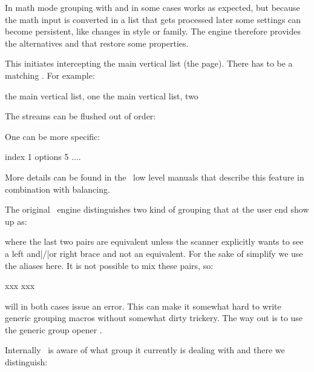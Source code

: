 \startnewprimitive[title={\prm {beginmathgroup}}]

In math mode grouping with  and  in some cases
works as expected, but because the math input is converted in a list that gets
processed later some settings can become persistent, like changes in style or
family. The engine therefore provides the alternatives  and
 that restore some properties.

\stopnewprimitive

\startnewprimitive[title={\prm {beginmvl}}]

This initiates intercepting the main vertical list (the page). There has to be a
matching . For example:

\starttyping
{} the main vertical list, one \endmvl
{} the main vertical list, two \endmvl
\stoptyping

The streams can be flushed out of order:

\starttyping
\setbox\scratchboxone{}
\setbox\scratchboxtwo{}
\stoptyping

One can be more specific:

\starttyping
\beginmvl
    index   1
    options 5 %
\relax
    ....
\endmvl
\stoptyping

More details can be found in the \CONTEXT\ low level manuals that describe this
feature in combination with balancing.

\stopnewprimitive

\startnewprimitive[title={\prm {beginsimplegroup}}]

The original \TEX\ engine distinguishes two kind of grouping that at the user end
show up as:

\starttyping
\begingroup \endgroup
\bgroup \egroup { }
\stoptyping

where the last two pairs are equivalent unless the scanner explicitly wants to see a
left and|/|or right brace and not an equivalent. For the sake of simplify we use
the aliases here. It is not possible to mix these pairs, so:

\starttyping
\bgroup xxx\endgroup
\begingroup xxx\egroup
\stoptyping

will in both cases issue an error. This can make it somewhat hard to write generic
grouping macros without somewhat dirty trickery. The way out is to use the generic
group opener .

Internally \LUAMETATEX\ is aware of  what group it currently is dealing with and
there we distinguish:

